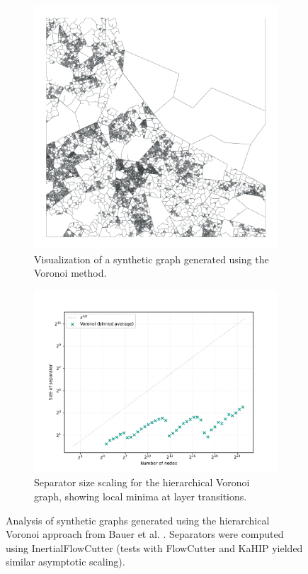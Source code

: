 \begin{figure}[tbhp]
	\centering
	\begin{subfigure}[t]{0.38\linewidth}
		\centering
		\includegraphics[width=\linewidth]{graphics/voronoi.png}
		\caption{Visualization of a synthetic graph generated using the Voronoi method.}
		\label{fig:voronoi_hierarchy_viz}
	\end{subfigure}
	\hfill
	\begin{subfigure}[t]{0.55\linewidth}
		\centering
		\includegraphics[width=\linewidth]{graphics/sep-voronoi.pdf}
		\caption{Separator size scaling for the hierarchical Voronoi graph, showing local minima at layer transitions.}
		\label{fig:voronoi_hierarchy_sep_plot}
	\end{subfigure}
	\caption{Analysis of synthetic graphs generated using the hierarchical Voronoi approach from Bauer et al. \cite{hutchison_synthetic_2010}. Separators were computed using InertialFlowCutter (tests with FlowCutter and KaHIP yielded similar asymptotic scaling).}
	\label{fig:voronoi_hierarchy}
\end{figure}

